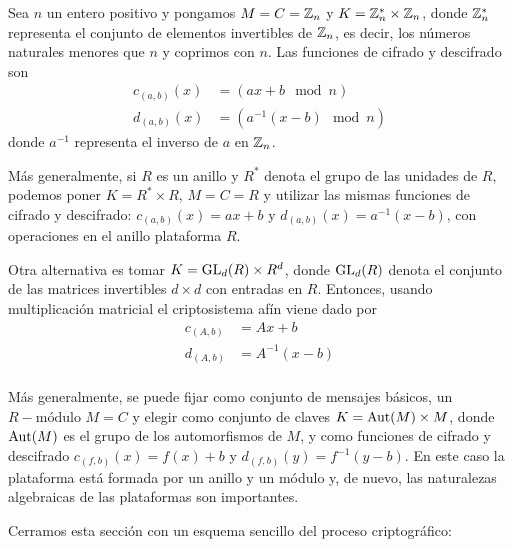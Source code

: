 Sea $n$ un entero positivo y pongamos $M = C = \mathbb{Z}_n$ y $K = \mathbb{Z}_n^*\times\mathbb{Z}_n$, donde $\mathbb{Z}_n^*$ representa el conjunto de elementos invertibles de $\mathbb{Z}_n$, es decir, los números naturales menores que $n$ y coprimos con $n$. Las funciones de cifrado y descifrado son
\begin{equation*}
    \begin{split}
        c_{(a,b)}(x) & = ( ax + b \mod n ) \\
        d_{(a,b)}(x) & = ( a^{-1}(x - b) \mod n )
    \end{split}
\end{equation*}
donde $a^{-1}$ representa el inverso de $a$ en $\mathbb{Z}_n$.

Más generalmente, si $R$ es un anillo y $R^*$ denota el grupo de las unidades de $R$, podemos poner $K=R^*\times R$, $M = C = R$ y utilizar las mismas funciones de cifrado y descifrado: $c_{(a,b)}(x) = ax + b$ y $d_{(a,b)}(x) = a^{-1}(x - b)$, con operaciones en el anillo plataforma $R$.

Otra alternativa es tomar $K=\operatorname{\rm GL}_d(R)\times R^d$, donde $\operatorname{\rm GL}_d(R)$ denota el conjunto de las matrices invertibles $d\times d$ con entradas en $R$. Entonces, usando multiplicación matricial el criptosistema afín viene dado por
\begin{equation*}
    \begin{split}
        c_{(A, b)} & = Ax+b \\
        d_{(A, b)} & = A^{-1}(x-b) \\
    \end{split}
\end{equation*}

Más generalmente, se puede fijar como conjunto de mensajes básicos, un $R-\text{módulo}$ $M=C$ y elegir como conjunto de claves $K=\operatorname{\rm Aut}(M)\times M$, donde $\operatorname{\rm Aut}(M)$ es el grupo de los automorfismos de $M$, y como funciones de cifrado y descifrado $c_{(f,b)}(x)=f(x)+b$ y $d_{(f,b)}(y)=f^{-1}(y-b)$. En este caso la plataforma está formada por un anillo y un módulo y, de nuevo, las naturalezas algebraicas de las plataformas son importantes.

Cerramos esta sección con un esquema sencillo del proceso criptográfico:

